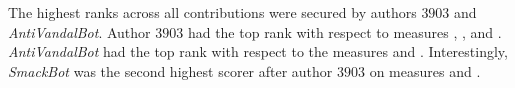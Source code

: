 The highest ranks across all contributions were secured by
authors $3903$ and \textit{AntiVandalBot}.
Author $3903$ had the top rank with respect to measures
\textonly, \textlong, \punish and \tenrevs.
\textit{AntiVandalBot} had the top rank with respect to the measures
\editlong and \editonly.
Interestingly, \textit{SmackBot} was the second highest scorer after
author $3903$ on measures \textlong and \punish.


